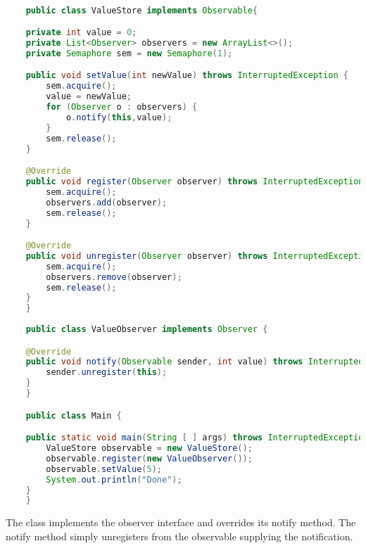 \begin{lstlisting}[label=lst:observer,
  caption={Observer pattern with locks},
  language=Java,  
  showspaces=false,
  showtabs=false,
  breaklines=true,
  showstringspaces=false,
  breakatwhitespace=true,
  commentstyle=\color{greencomments},
  keywordstyle=\color{bluekeywords},
  stringstyle=\color{redstrings}]  % Start your code-block

	public class ValueStore implements Observable{

    private int value = 0;
    private List<Observer> observers = new ArrayList<>();
    private Semaphore sem = new Semaphore(1);

    public void setValue(int newValue) throws InterruptedException {
        sem.acquire();
        value = newValue;
        for (Observer o : observers) {
            o.notify(this,value);
        }
        sem.release();
    }

    @Override
    public void register(Observer observer) throws InterruptedException {
        sem.acquire();
        observers.add(observer);
        sem.release();
    }

    @Override
    public void unregister(Observer observer) throws InterruptedException {
        sem.acquire();
        observers.remove(observer);
        sem.release();
    }
	}
	
	public class ValueObserver implements Observer {

    @Override
    public void notify(Observable sender, int value) throws InterruptedException {
        sender.unregister(this);
    }
	}

	public class Main {

    public static void main(String [ ] args) throws InterruptedException {
        ValueStore observable = new ValueStore();
        observable.register(new ValueObserver());
        observable.setValue(5);
        System.out.println("Done");
    }
	}
\end{lstlisting}

The  class implements the observer interface and overrides its notify method. The notify method simply unregisters from the observable supplying the notification.

